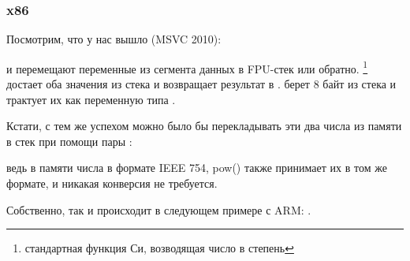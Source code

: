\subsubsection{x86}

Посмотрим, что у нас вышло (MSVC 2010):



\FLD и \FSTP перемещают переменные из сегмента данных в FPU-стек или обратно. 
\footnote{стандартная функция Си, возводящая число в степень} достает оба значения из стека и 
возвращает результат в . 
\printf берет 8 байт из стека и трактует их как переменную типа \Tdouble.

Кстати, с тем же успехом можно было бы перекладывать эти два числа из памяти в стек при помощи пары \MOV:
 
ведь в памяти числа в формате IEEE 754, pow() также принимает их в том же
формате, и никакая конверсия не требуется.

Собственно, так и происходит в следующем примере с ARM: .

